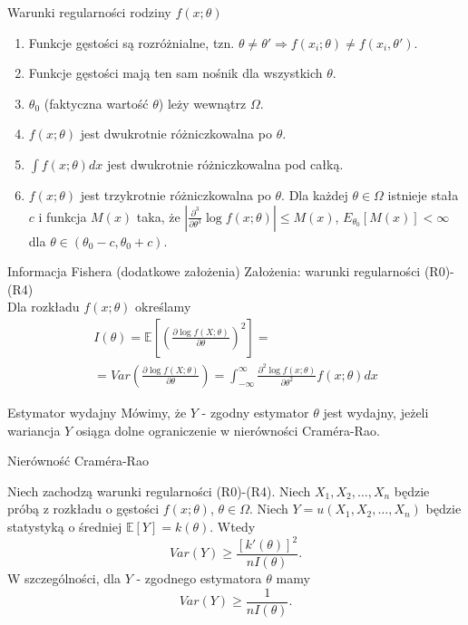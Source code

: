 \documentclass[avery5371, grid, frame]{flashcards}
\begin{document}
\begin{flashcard}[Definicja]{Warunki regularności rodziny $f(x; \theta)$}
\begin{footnotesize}
\begin{enumerate}
    \item Funkcje gęstości są rozróżnialne, tzn. $\theta \neq \theta' \Rightarrow f(x_i; \theta) \neq f(x_i, \theta')$.
    \item Funkcje gęstości mają ten sam nośnik dla wszystkich $\theta$.
    \item $\theta_0$ (faktyczna wartość $\theta$) leży wewnątrz $\Omega$.
    \item $f(x; \theta)$ jest dwukrotnie różniczkowalna po $\theta$.
    \item $\int f(x; \theta) dx$ jest dwukrotnie różniczkowalna pod całką.
    \item $f(x; \theta)$ jest trzykrotnie różniczkowalna po $\theta$. Dla każdej $\theta \in \Omega$ istnieje stała $c$ i funkcja $M(x)$ taka, że $\left| \frac{\partial^3}{\partial \theta^3} \log f(x; \theta) \right| \leq M(x)$, $E_{\theta_0}[M(x)] < \infty$ dla $\theta \in (\theta_0 - c, \theta_0 + c)$.
\end{enumerate}
\end{footnotesize}
\end{flashcard}

\begin{flashcard}[Definicja]{Informacja Fishera (dodatkowe założenia)}
    Założenia: warunki regularności (R0)-(R4) \\
    Dla rozkładu $f(x; \theta)$ określamy
    \begin{multline*}
    I(\theta) = \mathbb{E} \left[  \left( \frac{\partial \log f(X; \theta)}{\partial \theta}\right)^2 \right] = \\ = Var \left( \frac{\partial \log f(X; \theta)}{\partial \theta} \right) = \int_{-\infty}^\infty \frac{\partial^2 \log f(x; \theta)}{\partial \theta^2} f(x; \theta) dx
    \end{multline*}
\end{flashcard}

\begin{flashcard}[Definicja]{Estymator wydajny}
    Mówimy, że $Y$ - zgodny estymator $\theta$ jest wydajny, jeżeli wariancja $Y$ osiąga dolne ograniczenie w nierówności Cram\'era-Rao.
\end{flashcard}

\begin{flashcard}[Twierdzenie]{Nierówność Cram\'era-Rao}
\begin{small}
    Niech zachodzą warunki regularności (R0)-(R4).  Niech $X_1, X_2, \dots, X_n$ będzie próbą z rozkładu o gęstości $f(x; \theta)$, $\theta \in \Omega$. Niech $Y = u(X_1, X_2, \dots, X_n)$ będzie statystyką o średniej $\mathbb{E}[Y] = k(\theta)$. Wtedy $$ Var(Y) \geq \frac{[k'(\theta)]^2}{n I(\theta)}.$$
    W szczególności, dla $Y$ - zgodnego estymatora $\theta$ mamy $$ Var(Y) \geq \frac{1}{n I(\theta)}.$$
\end{small}
\end{flashcard}
\end{document}
